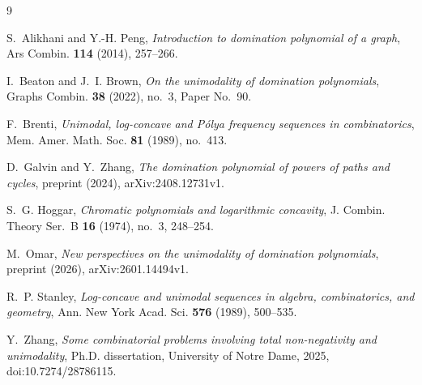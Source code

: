 \documentclass{amsart}
\theoremstyle{definition}
\theoremstyle{remark}
\numberwithin{equation}{section}
\begin{document}
\begin{thebibliography}{9}

S.~Alikhani and Y.-H. Peng, \emph{Introduction to domination polynomial of a graph}, Ars Combin. \textbf{114} (2014), 257--266.

I.~Beaton and J.~I. Brown, \emph{On the unimodality of domination polynomials}, Graphs Combin. \textbf{38} (2022), no.~3, Paper No.~90.

F.~Brenti, \emph{Unimodal, log-concave and P\'olya frequency sequences in combinatorics}, Mem. Amer. Math. Soc. \textbf{81} (1989), no.~413.

D.~Galvin and Y.~Zhang, \emph{The domination polynomial of powers of paths and cycles}, preprint (2024), arXiv:2408.12731v1.

S.~G. Hoggar, \emph{Chromatic polynomials and logarithmic concavity}, J. Combin. Theory Ser.~B \textbf{16} (1974), no.~3, 248--254.

M.~Omar, \emph{New perspectives on the unimodality of domination polynomials}, preprint (2026), arXiv:2601.14494v1.

R.~P. Stanley, \emph{Log-concave and unimodal sequences in algebra, combinatorics, and geometry}, Ann. New York Acad. Sci. \textbf{576} (1989), 500--535.

Y.~Zhang, \emph{Some combinatorial problems involving total non-negativity and unimodality}, Ph.D. dissertation, University of Notre Dame, 2025, doi:10.7274/28786115.

\end{thebibliography}
\end{document}
